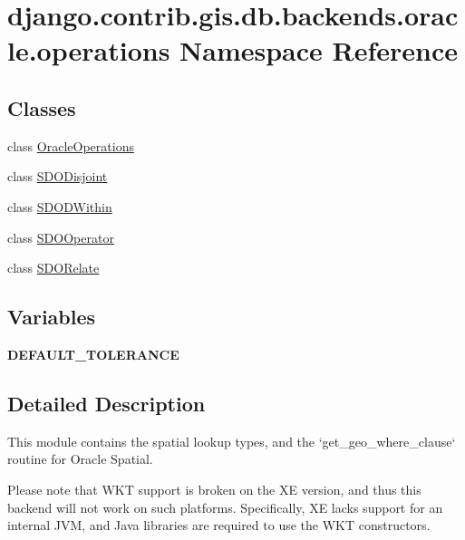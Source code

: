 \hypertarget{namespacedjango_1_1contrib_1_1gis_1_1db_1_1backends_1_1oracle_1_1operations}{}\section{django.\+contrib.\+gis.\+db.\+backends.\+oracle.\+operations Namespace Reference}
\label{namespacedjango_1_1contrib_1_1gis_1_1db_1_1backends_1_1oracle_1_1operations}
\subsection*{Classes}
\begin{DoxyCompactItemize}
\item 
class \mbox{\hyperlink{classdjango_1_1contrib_1_1gis_1_1db_1_1backends_1_1oracle_1_1operations_1_1_oracle_operations}{Oracle\+Operations}}
\item 
class \mbox{\hyperlink{classdjango_1_1contrib_1_1gis_1_1db_1_1backends_1_1oracle_1_1operations_1_1_s_d_o_disjoint}{S\+D\+O\+Disjoint}}
\item 
class \mbox{\hyperlink{classdjango_1_1contrib_1_1gis_1_1db_1_1backends_1_1oracle_1_1operations_1_1_s_d_o_d_within}{S\+D\+O\+D\+Within}}
\item 
class \mbox{\hyperlink{classdjango_1_1contrib_1_1gis_1_1db_1_1backends_1_1oracle_1_1operations_1_1_s_d_o_operator}{S\+D\+O\+Operator}}
\item 
class \mbox{\hyperlink{classdjango_1_1contrib_1_1gis_1_1db_1_1backends_1_1oracle_1_1operations_1_1_s_d_o_relate}{S\+D\+O\+Relate}}
\end{DoxyCompactItemize}
\subsection*{Variables}
\begin{DoxyCompactItemize}
\item 
\mbox{\label{namespacedjango_1_1contrib_1_1gis_1_1db_1_1backends_1_1oracle_1_1operations_abcbb1d20e54c8aeb6560637103c0c34a}} 
{\bfseries D\+E\+F\+A\+U\+L\+T\+\_\+\+T\+O\+L\+E\+R\+A\+N\+CE}
\end{DoxyCompactItemize}


\subsection{Detailed Description}
\begin{DoxyVerb} This module contains the spatial lookup types, and the `get_geo_where_clause`
 routine for Oracle Spatial.

 Please note that WKT support is broken on the XE version, and thus
 this backend will not work on such platforms.  Specifically, XE lacks
 support for an internal JVM, and Java libraries are required to use
 the WKT constructors.
\end{DoxyVerb}
 